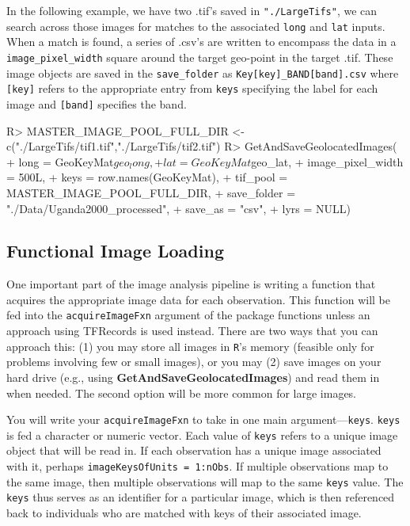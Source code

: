 \documentclass[nojss,shortnames]{jss} %
\begin{document}
In the following example, we have two .tif's saved in \verb|"./LargeTifs"|, we can search across those images for matches to the associated \Verb|long| and \Verb|lat| inputs. When a match is found, a series of .csv's are written to encompass the data in a \verb|image_pixel_width| square around the target geo-point in the target .tif. These image objects are saved in the \verb|save_folder| as 
\verb|Key[key]_BAND[band].csv| where \Verb|[key]| refers to the appropriate entry from \Verb|keys| specifying the label for each image and \Verb|[band]| specifies the band. 
\begin{CodeChunk}
\begin{CodeInput}
R> MASTER_IMAGE_POOL_FULL_DIR <- c("./LargeTifs/tif1.tif","./LargeTifs/tif2.tif")
R> GetAndSaveGeolocatedImages(
+    long = GeoKeyMat$geo_long,
+    lat = GeoKeyMat$geo_lat,
+    image_pixel_width = 500L,
+    keys = row.names(GeoKeyMat),
+    tif_pool = MASTER_IMAGE_POOL_FULL_DIR,
+    save_folder = "./Data/Uganda2000_processed",
+    save_as = "csv",
+    lyrs = NULL)
\end{CodeInput}
\end{CodeChunk}

\subsection{Functional Image Loading}\label{s:AcquireImage}
One important part of the image analysis pipeline is writing a function that acquires the appropriate image data for each observation. This function will be fed into the \texttt{acquireImageFxn} argument of the package functions unless an approach using TFRecords is used instead. There are two ways that you can approach this: (1) you may store all images in \texttt{R}'s memory (feasible only for problems involving few or small images), or you may (2) save images on your hard drive (e.g., using {\bf GetAndSaveGeolocatedImages}) and read them in when needed. The second option will be more common for large images.

You will write your \texttt{acquireImageFxn} to take in one main argument---\texttt{keys}. \texttt{keys} is fed a character or numeric vector. Each value of \texttt{keys} refers to a unique image object that will be read in. If each observation has a unique image associated with it, perhaps \texttt{imageKeysOfUnits = 1:nObs}. If multiple observations map to the same image, then multiple observations will map to the same \texttt{keys} value. The \texttt{keys} thus serves as an identifier for a particular image, which is then referenced back to individuals who are matched with keys of their associated image.  
\end{document}
